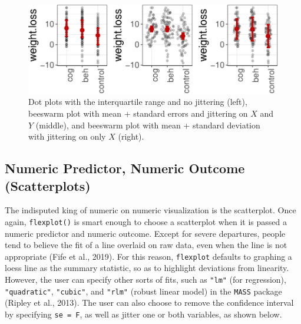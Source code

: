 \documentclass[
  doc]{apa6}
\begin{document}
\begin{figure}

{\centering \includegraphics[width=0.9\linewidth]{flexplot_psychmeth_files/figure-latex/jitterit-1} 

}

\caption{Dot plots with the interquartile range and no jittering (left), beeswarm plot with mean + standard errors and jittering on $X$ and $Y$ (middle), and beeswarm plot with mean + standard deviation with jittering on only $X$ (right).}\label{fig:jitterit}
\end{figure}

\hypertarget{numeric-predictor-numeric-outcome-scatterplots}{%
\subsection{Numeric Predictor, Numeric Outcome (Scatterplots)}\label{numeric-predictor-numeric-outcome-scatterplots}}

The indisputed king of numeric on numeric visualization is the scatterplot. Once again, \texttt{flexplot()} is smart enough to choose a scatterplot when it is passed a numeric predictor and numeric outcome. Except for severe departures, people tend to believe the fit of a line overlaid on raw data, even when the line is not appropriate (Fife et al., 2019). For this reason, \texttt{flexplot} defaults to graphing a loess line as the summary statistic, so as to highlight deviations from linearity. However, the user can specify other sorts of fits, such as \texttt{"lm"} (for regression), \texttt{"quadratic"}, \texttt{"cubic"}, and \texttt{"rlm"} (robust linear model) in the \texttt{MASS} package (Ripley et al., 2013). The user can also choose to remove the confidence interval by specifying \texttt{se\ =\ F}, as well as jitter one or both variables, as shown below.
\end{document}
